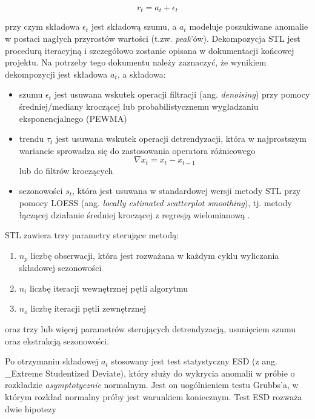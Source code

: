 \documentclass{article}
\begin{document}
\begin{equation*}
  r_{t} = a_{t} + \epsilon_{t}
\end{equation*}



przy czym składowa \(\epsilon_{t}\) jest składową szumu, a \(a_{t}\)
modeluje poszukiwane anomalie w postaci nagłych przyrostów wartości
(t.zw. \emph{peak}'ów). Dekompozycja STL jest procedurą iteracyjną i
szczegółowo zostanie opisana w dokumentacji końcowej projektu. Na
potrzeby tego dokumentu należy zaznaczyć, że wynikiem dekompozycji jest
składowa \(a_{t}\), a składowa:

\begin{itemize}
\item
  szumu \(\epsilon_{t}\) jest usuwana wskutek operacji filtracji (ang.
  \emph{denoising}) przy pomocy średniej/mediany kroczącej lub
  probabilistycznemu wygładzaniu eksponencjalnego (PEWMA) \cite{PEWMA}
\item
  trendu \(\tau_{t}\) jest usuwana wskutek operacji detrendyzacji, która
  w najprostszym wariancie sprowadza się do zastosowania operatora
  różnicowego \begin{equation*} \nabla x_{t} = x_{t} - x_{t -1} \end{equation*}
    lub do filtrów kroczących
\item
  sezonowości \(s_{t}\), która jest usuwana w standardowej wersji
  metody STL przy pomocy LOESS (ang. \emph{locally estimated scatterplot
  smoothing}), tj. metody łączącej działanie średniej kroczącej z
  regresją wielomianową \cite{stl-origin}.
\end{itemize}

STL zawiera trzy parametry sterujące metodą:

\begin{enumerate}
\def\labelenumi{\arabic{enumi}.}
\item
  \(n_{p}\) liczbę obserwacji, która jest rozważana w każdym cyklu
  wyliczania składowej sezonowości
\item
  \(n_{i}\) liczbę iteracji wewnętrznej pętli algorytmu
\item
  \(n_{o}\) liczbę iteracji pętli zewnętrznej
\end{enumerate}

oraz trzy lub więcej parametrów sterujących detrendyzacją, usunięciem
szumu oraz ekstrakcją sezonowości.

Po otrzymaniu składowej \(a_{t}\) stosowany jest test statystyczny ESD
(z ang. \_Extreme Studentized Deviate), który służy do wykrycia
anomalii w próbie o rozkładzie \emph{asymptotycznie} normalnym. Jest on
uogólnieniem testu Grubbs'a, w którym rozkład normalny próby jest
warunkiem koniecznym. Test ESD rozważa dwie hipotezy
\end{document}
